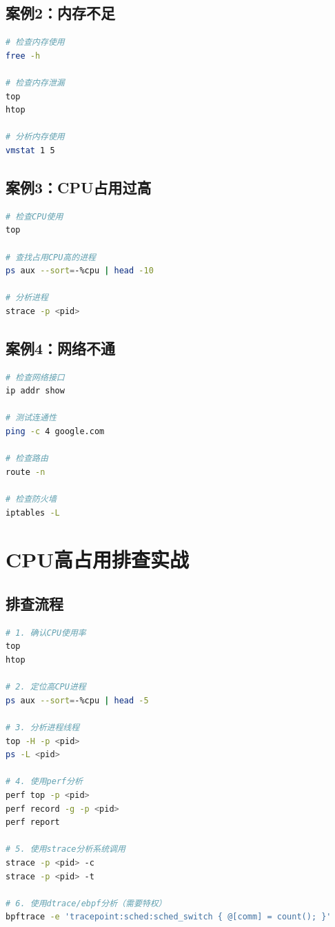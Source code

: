 \documentclass[12pt,UTF8]{ctexbook}
\begin{document}
\subsection*{案例2：内存不足}
\begin{lstlisting}[language=bash]
# 检查内存使用
free -h

# 检查内存泄漏
top
htop

# 分析内存使用
vmstat 1 5
\end{lstlisting}

\subsection*{案例3：CPU占用过高}
\begin{lstlisting}[language=bash]
# 检查CPU使用
top

# 查找占用CPU高的进程
ps aux --sort=-%cpu | head -10

# 分析进程
strace -p <pid>
\end{lstlisting}

\subsection*{案例4：网络不通}
\begin{lstlisting}[language=bash]
# 检查网络接口
ip addr show

# 测试连通性
ping -c 4 google.com

# 检查路由
route -n

# 检查防火墙
iptables -L
\end{lstlisting}

\section{CPU高占用排查实战}
\label{sec:cpu-troubleshoot}

\subsection*{排查流程}

\begin{lstlisting}[language=bash]
# 1. 确认CPU使用率
top
htop

# 2. 定位高CPU进程
ps aux --sort=-%cpu | head -5

# 3. 分析进程线程
top -H -p <pid>
ps -L <pid>

# 4. 使用perf分析
perf top -p <pid>
perf record -g -p <pid>
perf report

# 5. 使用strace分析系统调用
strace -p <pid> -c
strace -p <pid> -t

# 6. 使用dtrace/ebpf分析（需要特权）
bpftrace -e 'tracepoint:sched:sched_switch { @[comm] = count(); }'
\end{lstlisting}
\end{document}
